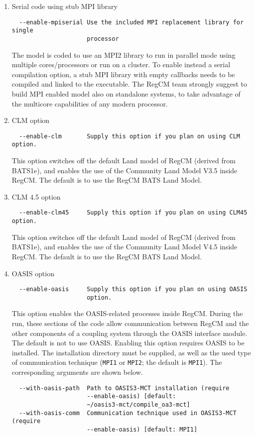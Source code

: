 \begin{enumerate}
\item Serial code using stub MPI library
\begin{Verbatim}
  --enable-mpiserial Use the included MPI replacement library for single
                     processor
\end{Verbatim}
The model is coded to use an MPI2 library to run in parallel mode using
multiple cores/processors or run on a cluster. To enable instead a serial
compilation option, a stub MPI library with empty callbacks needs to be
compiled and linked to the executable.
The RegCM team strongly suggest to build MPI enabled model also on standalone
systems, to take advantage of the multicore capabilities of any modern
processor.
\item CLM option
\begin{Verbatim}
  --enable-clm       Supply this option if you plan on using CLM option.
\end{Verbatim}
This option switches off the default Land model of RegCM (derived from BATS1e),
and enables the use of the Community Land Model V3.5 inside RegCM. The default
is to use the RegCM BATS Land Model.
\item CLM 4.5 option
\begin{Verbatim}
  --enable-clm45     Supply this option if you plan on using CLM45 option.
\end{Verbatim}
This option switches off the default Land model of RegCM (derived from BATS1e),
and enables the use of the Community Land Model V4.5 inside RegCM. The default
is to use the RegCM BATS Land Model.
\item OASIS option
\begin{verbatim}
  --enable-oasis     Supply this option if you plan on using OASIS
                     option.     
\end{verbatim}
This option enables the OASIS-related processes inside RegCM. During the run,
these sections of the code allow communication between RegCM and the other
components of a coupling system through the OASIS interface module. The default
is not to use OASIS.
Enabling this option requires OASIS to be installed. The installation directory
must be supplied, as well as the used type of communication technique
(\verb=MPI1= or \verb=MPI2=; the default is \verb=MPI1=).
The corresponding arguments are shown below.
\begin{verbatim}
  --with-oasis-path  Path to OASIS3-MCT installation (require
                     --enable-oasis) [default:
                     ~/oasis3-mct/compile_oa3-mct]
  --with-oasis-comm  Communication technique used in OASIS3-MCT (require
                     --enable-oasis) [default: MPI1]
\end{verbatim}
\end{enumerate}


